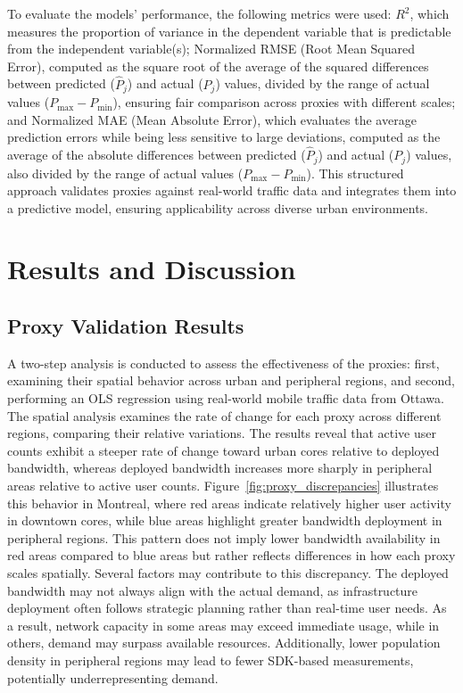 \documentclass[conference]{IEEEtran}
\begin{document}
To evaluate the models' performance, the following metrics were used: \(R^2\), which measures the proportion of variance in the dependent variable that is predictable from the independent variable(s); Normalized RMSE (Root Mean Squared Error), computed as the square root of the average of the squared differences between predicted (\( \hat{P}_j \)) and actual (\( P_j \)) values, divided by the range of actual values (\( P_{\max} - P_{\min} \)), ensuring fair comparison across proxies with different scales; and Normalized MAE (Mean Absolute Error), which evaluates the average prediction errors while being less sensitive to large deviations, computed as the average of the absolute differences between predicted (\( \hat{P}_j \)) and actual (\( P_j \)) values, also divided by the range of actual values (\( P_{\max} - P_{\min} \)).
This structured approach validates proxies against real-world traffic data and integrates them into a predictive model, ensuring applicability across diverse urban environments.




\section{Results and Discussion}\label{sec:results_discussion}
\subsection{Proxy Validation Results}

A two-step analysis is conducted to assess the effectiveness of the proxies: first, examining their spatial behavior across urban and peripheral regions, and second, performing an OLS regression using real-world mobile traffic data from Ottawa.
The spatial analysis examines the rate of change for each proxy across different regions, comparing their relative variations. The results reveal that active user counts exhibit a steeper rate of change toward urban cores relative to deployed bandwidth, whereas deployed bandwidth increases more sharply in peripheral areas relative to active user counts. Figure~\ref{fig:proxy_discrepancies} illustrates this behavior in Montreal, where red areas indicate relatively higher user activity in downtown cores, while blue areas highlight greater bandwidth deployment in peripheral regions. This pattern does not imply lower bandwidth availability in red areas compared to blue areas but rather reflects differences in how each proxy scales spatially.
Several factors may contribute to this discrepancy. The deployed bandwidth may not always align with the actual demand, as infrastructure deployment often follows strategic planning rather than real-time user needs. As a result, network capacity in some areas may exceed immediate usage, while in others, demand may surpass available resources. Additionally, lower population density in peripheral regions may lead to fewer SDK-based measurements, potentially underrepresenting demand.
\end{document}
